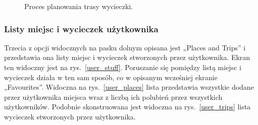 \begin{figure}[H]
            \caption{Proces planowania trasy wycieczki.\label{draw}}
            \qquad
        \end{figure} 
        \vspace{1cm}

        \subsubsection{Listy miejsc i wycieczek użytkownika}
        Trzecia z opcji widocznych na pasku dolnym opisana jest „Places and Trips” i przedstawia ona listy miejsc i wycieczek stworzonych przez użytkownika. Ekran ten widoczny jest na rys.~\ref{user_stuff}.
        Poruszanie się pomiędzy listą miejsc i wycieczek działa w ten sam sposób, co w opisanym wcześniej ekranie „Favourites”. Widoczna na rys.~\ref{user_places} lista przedstawia wszystkie dodane
        przez użytkownika miejsca wraz z liczbą ich polubień przez wszystkich użytkowników. Podobnie skonstruowana jest widoczna na rys.~\ref{user_trips} lista wycieczek stworzonych przez użytkownika.

